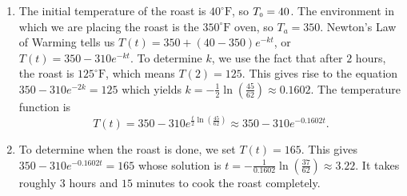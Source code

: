 {
\begin{enumerate}

\item  The initial temperature of the roast is $40^{\circ}\mbox{F}$, so $T_{\mbox{\tiny$0$}} = 40$.  The environment in which we are placing the roast is the $350^{\circ}\mbox{F}$ oven, so $T_{a} = 350$. Newton's Law of Warming tells us $T(t) = 350 + (40-350)e^{-kt}$, or $T(t) = 350 - 310e^{-kt}$.  To determine $k$, we use the fact that after $2$ hours, the roast is  $125^{\circ}\mbox{F}$, which means $T(2) = 125$.  This gives rise to the equation $350 - 310e^{-2k} = 125$ which yields $k = -\frac{1}{2} \ln \left( \frac{45}{62}  \right) \approx 0.1602$.  The temperature function is \[T(t) = 350 - 310 e^{\frac{t}{2} \ln \left( \frac{45}{62}  \right)} \approx 350- 310 e^{-0.1602 t}.\]


\item  To determine when the roast is done, we set $T(t) = 165$.  This gives $350- 310 e^{-0.1602 t} = 165$ whose solution is $t = -\frac{1}{0.1602} \ln \left( \frac{37}{62}  \right) \approx 3.22$.  It takes roughly $3$ hours and $15$ minutes to cook the roast completely. 

\end{enumerate}
}

\medskip

